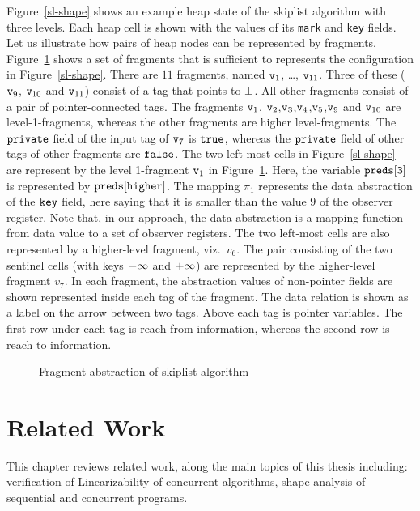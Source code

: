Figure~\ref{sl-shape} shows an example heap state of the
skiplist algorithm with three levels. Each heap cell is shown with the values of its {\tt mark} and {\tt key} fields. %
Let us illustrate how pairs of heap nodes can be represented by fragments.
Figure~\ref{fig:skiplistabs} shows a set of fragments that is sufficient to
represents the configuration in Figure~\ref{sl-shape}. There are $11$ fragments, named $\mathtt{v}_1$, \ldots , $\mathtt{v}_{11}$. Three of
these ($\mathtt{v}_9$, $\mathtt{v}_{10}$ and $\mathtt{v}_{11}$) consist of a tag that points to $\bot$. All other fragments consist of a pair of pointer-connected tags. The fragments $\mathtt{v}_1$, $\mathtt{v}_2$,$\mathtt{v}_3$,$\mathtt{v}_4$,$\mathtt{v}_5$,$\mathtt{v}_9$ and $\mathtt{v}_{10}$ are level-1-fragments, whereas the other fragments are higher level-fragments. The $\tt private$ field of the input tag of $\mathtt{v}_7$ is $\tt true$, whereas the $\tt private$ field of other tags of other fragments are $\tt false$. The two left-most cells
in Figure~\ref{sl-shape} are represent by the level 1-fragment $\mathtt{v}_1$ in
Figure~\ref{fig:skiplistabs}. Here, the variable $\tt preds[3]$ is represented by $\tt preds[higher]$. The mapping $\pi_1$ represents the data abstraction of the $\tt key$ field, here saying that it is smaller than the value $9$ of the observer register. Note that, in our approach, the data abstraction is a mapping function from data value to a set of observer registers.
The two left-most cells are also represented by
a higher-level fragment, viz.\ $v_6$.
The pair consisting of the two sentinel cells (with keys $\tt -\infty$ and $\tt +\infty$) are represented by the higher-level fragment $v_7$. In each fragment, the abstraction values of non-pointer fields are shown represented inside each tag of the fragment. The data relation is shown as a label on the  arrow between two tags. Above each tag is pointer variables. The first row under each tag is reach from information, whereas the second row is reach to information.
 \begin{figure}
\center
	
\caption{Fragment abstraction of skiplist algorithm}
\label{fig:skiplistabs}
\vspace*{-0.6cm}
\end{figure} 


\chapter{Related Work}
This chapter reviews related work, along the main topics of this thesis including: verification of Linearizability of concurrent algorithms, 
shape analysis of sequential and concurrent programs.

